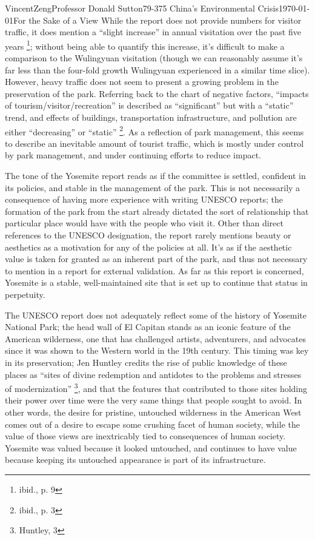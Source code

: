 \documentclass[12pt]{article}
\begin{document}
\begin{mla}{Vincent}{Zeng}{Professor Donald Sutton}{79-375 China's Environmental Crisis}{\today}{For the Sake of a View}
While the report does not provide numbers for visitor traffic, it does mention
a ``slight increase'' in annual visitation over the past five years
\footnote{ibid., p. 9}; without being able to quantify this increase, it's
difficult to make a comparison to the Wulingyuan visitation (though we can
reasonably assume it's far less than the four-fold growth Wulingyuan
experienced in a similar time slice). However, heavy
traffic does not seem to present a growing problem in the preservation of the
park. Referring back to the chart of negative factors, ``impacts of
tourism/visitor/recreation'' is described as ``significant'' but with a
``static'' trend, and effects of buildings, transportation infrastructure, and
pollution are either ``decreasing'' or ``static'' \footnote{ibid., p. 3}. As a
reflection of park management, this seems to describe an inevitable amount of
tourist traffic, which is mostly under control by park management, and under
continuing efforts to reduce impact.

The tone of the Yosemite report reads as if the committee is settled, confident
in its policies, and stable in the management of the park. This is not
necessarily a consequence of having more experience with writing UNESCO
reports; the formation of the park from the start already dictated the sort
of relationship that particular place would have with the people who visit it.
Other than direct references to the UNESCO designation, the report rarely
mentions beauty or aesthetics as a motivation for any of the policies at all. It's
as if the aesthetic value is taken for granted as an inherent part of the park,
and thus not necessary to mention in a report for external validation. As far
as this report is concerned, Yosemite is a stable, well-maintained site that is
set up to continue that status in perpetuity.

The UNESCO report does not adequately reflect some of the history of Yosemite
National Park; the head wall of El Capitan stands as an iconic feature of the
American wilderness, one that has challenged artists, adventurers, and
advocates since it was shown to the Western world in the 19th century. This
timing was key in its preservation; Jen Huntley credits the rise of public
knowledge of these places as ``sites of divine redemption and antidotes to the
problems and stresses of modernization'' \footnote{Huntley, 3}, and that the
features that contributed to those sites holding their power over time were the
very same things that people sought to avoid. In other words, the desire for
pristine, untouched wilderness in the American West comes out of a desire to
escape some crushing facet of human society, while the value of those views are
inextricably tied to consequences of human society. Yosemite was valued because
it looked untouched, and continues to have value because keeping its untouched
appearance is part of its infrastructure.


\end{mla}
\end{document}
